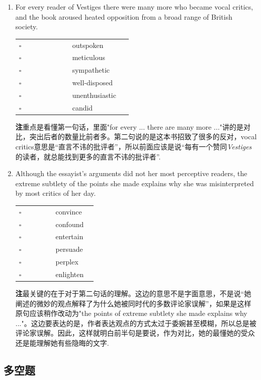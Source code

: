 \documentclass[11pt,space]{ctexart}
\newcommand{\note}[1]{{\heiti\textbf{注\hspace{1em}}}#1.}
\newcommand{\senequiv}[6]{
\begin{center}
\begin{tabularx}{\linewidth}{>{\raggedleft\arraybackslash}p{0.4\linewidth} p{0.45\linewidth}}
    $\square$ & {#1} \\
    $\square$ & {#2} \\
    $\square$ & {#3} \\
    $\square$ & {#4} \\
    $\square$ & {#5} \\
    $\square$ & {#6} \\
\end{tabularx}
\end{center}
}
\begin{document}
\begin{enumerate}
\item For every \blank{} reader of Vestiges there were many more who became vocal critics, and the book aroused heated opposition from a broad range of British society.
\senequiv{outspoken}{meticulous}{sympathetic}{well-disposed}{unenthusiastic}{candid}
\note{重点是看懂第一句话，里面"for every ... there are many more ..."讲的是对比，突出后者的数量比前者多。第二句说的是这本书招致了很多的反对，vocal critics意思是“直言不讳的批评者”，所以前面应该是说“每有一个赞同\textit{Vestiges}的读者，就总能找到更多的直言不讳的批评者”}

\item Although the essayist's arguments did not \blank{} her most perceptive readers, the extreme subtlety of the points she made explains why she was misinterpreted by most critics of her day.
\senequiv{convince}{confound}{entertain}{persuade}{perplex}{enlighten}
\note{最关键的在于对于第二句话的理解。这边的意思不是字面意思，不是说“她阐述的微妙的观点解释了为什么她被同时代的多数评论家误解”，如果是这样原句应该稍作改动为"the points of extreme subtlety she made explains why ..."。这边要表达的是，作者表达观点的方式太过于委婉甚至模糊，所以总是被评论家误解。因此，这样就明白前半句是要说，作为对比，她的最懂她的受众还是能理解她有些隐晦的文字}

\end{enumerate}

\subsection*{多空题}
\end{document}
